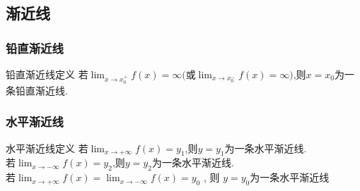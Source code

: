 \documentclass[8pt a4paper, oneside, UTF8]{ctexbook}  %
\begin{document}
\begin{sloppypar}
    \subsection{渐近线}
    \subsubsection{铅直渐近线}
    \begin{defn}{铅直渐近线定义}{}
        若$\lim_{x\to x_0^+}f(x)=\infty($或$\lim_{x\to x_0^-}f(x)=\infty)$,则$x=x_0$为一条铅直渐近线.
    \end{defn}
    \subsubsection{水平渐近线}
    \begin{defn}{水平渐近线定义}{}
        若$\lim_{x\to+\infty} f(x)=y_{1}$,则$y=y_1$为一条水平渐近线.\\
        若$\lim_{x\to-\infty} f(x)=y_{2}$,则$y=y_{2}$为一条水平渐近线.\\
        若$\lim _{x\to + \infty }f( x) = \lim _{x\to - \infty }f( x) = y_{0}$ , 则 $y= y_{0}$为一条水平渐近线
    \end{defn}

\end{sloppypar}
\end{document}
